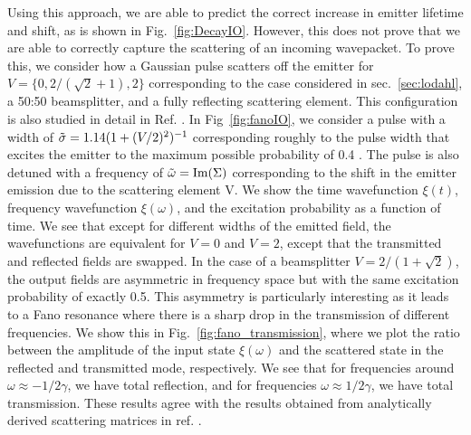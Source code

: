 Using this approach, we are able to predict the correct increase in emitter lifetime and shift, as is shown in Fig.~\ref{fig:DecayIO}. However, this does not prove that we are able to correctly capture the scattering of an incoming wavepacket. To prove this, we consider how a Gaussian pulse scatters off the emitter for $V=\{0,2/(\sqrt{2}+1),2\}$ corresponding to the case considered in sec.~\ref{sec:lodahl}, a 50:50 beamsplitter, and a fully reflecting scattering element. This configuration is also studied in detail in Ref. \cite{Joanesarson2020Few-photonGeometries}. In Fig~\ref{fig:fanoIO}, we consider a pulse with a width of $\Tilde{\sigma} = 1.14 (1+(V/2)^2)^{-1}$ corresponding roughly to the pulse width that excites the emitter to the maximum possible probability of 0.4 \cite{Joanesarson2020Few-photonGeometries}. The pulse is also detuned with a frequency of $\Tilde{\omega} = \mathrm{Im}(\Sigma)$ corresponding to the shift in the emitter emission due to the scattering element V. We show the time wavefunction $\xi(t)$, frequency wavefunction $\xi(\omega)$, and the excitation probability as a function of time. We see that except for different widths of the emitted field, the wavefunctions are equivalent for $V=0$ and $V=2$, except that the transmitted and reflected fields are swapped. In the case of a beamsplitter $V=2/(1+\sqrt{2})$, the output fields are asymmetric in frequency space but with the same excitation probability of exactly 0.5. This asymmetry is particularly interesting as it leads to a Fano resonance where there is a sharp drop in the transmission of different frequencies. We show this in Fig.~\ref{fig:fano_transmission}, where we plot the ratio between the amplitude of the input state $\xi(\omega)$ and the scattered state in the reflected and transmitted mode, respectively. We see that for frequencies around $\omega \approx -1/2 \gamma$, we have total reflection, and for frequencies $\omega \approx 1/2 \gamma$, we have total transmission. These results agree with the results obtained from analytically derived scattering matrices in ref. \cite{Joanesarson2020Few-photonGeometries}.       

